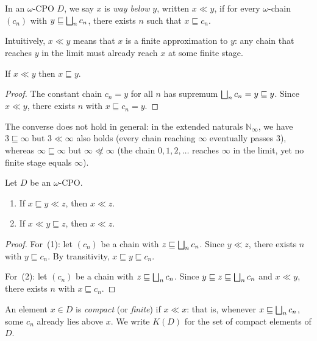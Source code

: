 \begin{definition}
\label{def:way-below}
In an $\omega$-CPO $D$, we say $x$ is \emph{way below} $y$, written
$x \ll y$, if for every $\omega$-chain $(c_n)$ with $y \sqsubseteq
\bigsqcup_n c_n$, there exists $n$ such that $x \sqsubseteq c_n$.
\end{definition}

Intuitively, $x \ll y$ means that $x$ is a finite approximation to $y$:
any chain that reaches $y$ in the limit must already reach $x$ at some
finite stage.

\begin{proposition}
\label{prop:way-below-order}
If $x \ll y$ then $x \sqsubseteq y$.
\end{proposition}

\begin{proof}
The constant chain $c_n = y$ for all $n$ has supremum
$\bigsqcup_n c_n = y \sqsubseteq y$. Since $x \ll y$, there exists $n$ with
$x \sqsubseteq c_n = y$.
\end{proof}

The converse does not hold in general: in the extended naturals
$\mathbb{N}_\infty$, we have $3 \sqsubseteq \infty$ but $3 \ll \infty$
also holds (every chain reaching $\infty$ eventually passes $3$), whereas
$\infty \sqsubseteq \infty$ but $\infty \not\ll \infty$ (the chain
$0, 1, 2, \ldots$ reaches $\infty$ in the limit, yet no finite stage
equals $\infty$).

\begin{proposition}
\label{prop:way-below-trans}
Let $D$ be an $\omega$-CPO.
\begin{enumerate}
  \item If $x \sqsubseteq y \ll z$, then $x \ll z$.
  \item If $x \ll y \sqsubseteq z$, then $x \ll z$.
\end{enumerate}
\end{proposition}

\begin{proof}
For~(1): let $(c_n)$ be a chain with $z \sqsubseteq \bigsqcup_n c_n$. Since
$y \ll z$, there exists $n$ with $y \sqsubseteq c_n$. By transitivity,
$x \sqsubseteq y \sqsubseteq c_n$.

For~(2): let $(c_n)$ be a chain with $z \sqsubseteq \bigsqcup_n c_n$. Since
$y \sqsubseteq z \sqsubseteq \bigsqcup_n c_n$ and $x \ll y$, there exists
$n$ with $x \sqsubseteq c_n$.
\end{proof}

\begin{definition}
\label{def:compact}
An element $x \in D$ is \emph{compact} (or \emph{finite}) if
$x \ll x$: that is, whenever $x \sqsubseteq \bigsqcup_n c_n$, some $c_n$
already lies above $x$. We write $K(D)$ for the set of compact elements
of $D$.
\end{definition}

